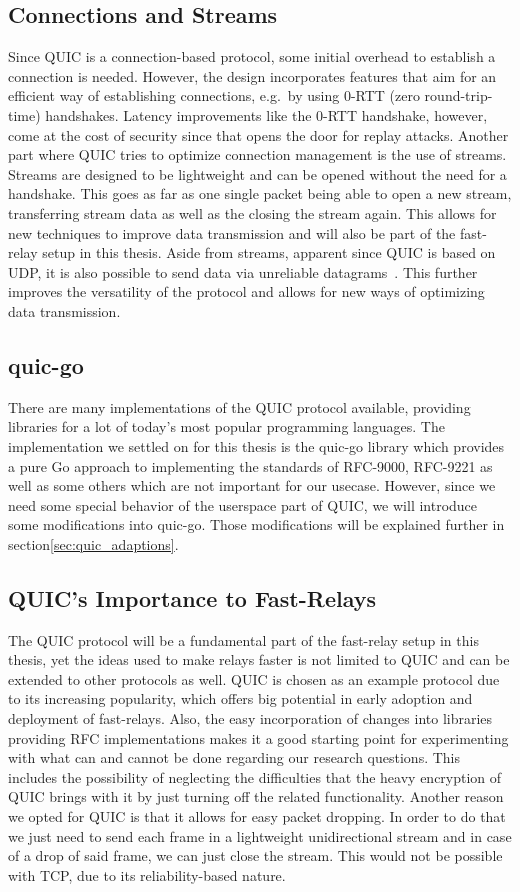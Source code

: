 \subsection{Connections and Streams}
Since QUIC is a connection-based protocol, some initial overhead to establish a connection is needed.
However, the design incorporates features that aim for an efficient way of establishing 
connections, e.g.\ by using 0-RTT (zero round-trip-time) handshakes.
Latency improvements like the 0-RTT handshake, however, come at the cost of security since that opens 
the door for replay attacks.
Another part where QUIC tries to optimize connection management is the use of streams.
Streams are designed to be lightweight and can be opened without the need for a handshake.
This goes as far as one single packet being able to open a new stream, transferring stream data
as well as the closing the stream again.
This allows for new techniques to improve data transmission and will also be part of the fast-relay 
setup in this thesis.
Aside from streams, apparent since QUIC is based on UDP, it is also possible to send data via
unreliable datagrams~\parencite{rfc-9221}.
This further improves the versatility of the protocol and allows for new ways of optimizing data transmission.

\subsection{quic-go}
There are many implementations of the QUIC protocol available, providing libraries for a lot of 
today's most popular programming languages.
The implementation we settled on for this thesis is the quic-go library which provides a pure Go 
approach to implementing the standards of RFC-9000, RFC-9221 as well as some others which are not 
important for our usecase. 
However, since we need some special behavior of the userspace part of QUIC, we will introduce some 
modifications into quic-go.  
Those modifications will be explained further in section\nobreakspace\ref{sec:quic_adaptions}.

\subsection{QUIC's Importance to Fast-Relays}
The QUIC protocol will be a fundamental part of the fast-relay setup in this thesis, yet the ideas used 
to make relays faster is not limited to QUIC and can be extended to other protocols as well.
QUIC is chosen as an example protocol due to its increasing popularity, which offers big potential 
in early adoption and deployment of fast-relays.
Also, the easy incorporation of changes into libraries providing RFC implementations makes it a good 
starting point for experimenting with what can and cannot be done regarding our research questions.
This includes the possibility of neglecting the difficulties that the heavy encryption of QUIC brings with 
it by just turning off the related functionality.
Another reason we opted for QUIC is that it allows for easy packet dropping.
In order to do that we just need to send each frame in a lightweight unidirectional stream and in 
case of a drop of said frame, we can just close the stream.
This would not be possible with TCP, due to its reliability-based nature.

